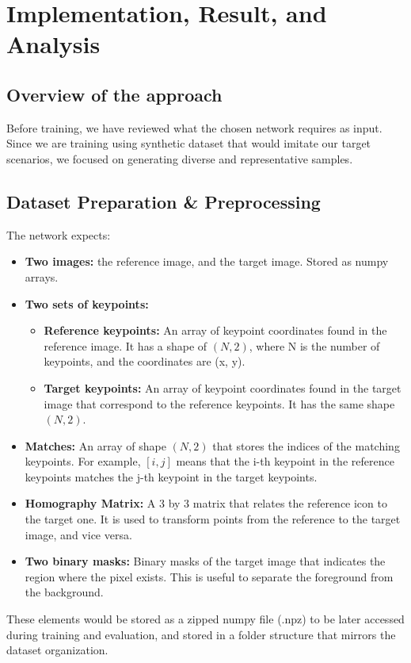\chapter{Implementation, Result, and Analysis}
\section{Overview of the approach}
Before training, we have reviewed what the chosen network requires as input.
Since we are training using synthetic dataset that would imitate our target
scenarios, we focused on generating diverse and representative samples.
\section{Dataset Preparation \& Preprocessing}
The network expects:
\begin{itemize}
    \item \textbf{Two images:} the reference image, and the target image. Stored as numpy arrays.
    \item \textbf{Two sets of keypoints:}
          \begin{itemize}
              \item \textbf{Reference keypoints:} An array of keypoint coordinates found in the reference
                    image. It has a shape of $(N, 2)$, where N is the number of keypoints, and the coordinates are (x, y).
              \item \textbf{Target keypoints:} An array of keypoint coordinates found in the target image that correspond to the reference keypoints. It has the same shape $(N, 2)$.
          \end{itemize}
    \item \textbf{Matches:} An array of shape $(N, 2)$ that stores the indices of the matching keypoints. For example, $[i, j]$ means that the i-th keypoint in the reference keypoints matches the j-th keypoint in the target keypoints.
    \item \textbf{Homography Matrix: } A 3 by 3 matrix that relates the reference icon to the target one. It is used to transform points from the reference to the target image, and vice versa.
    \item \textbf{Two binary masks:} Binary masks of the target image that indicates the region where the pixel exists. This is useful to separate the foreground from the background.
\end{itemize}
These elements would be stored as a zipped numpy file (.npz) to be later accessed during training and evaluation, and stored in a folder structure that mirrors the dataset organization.
